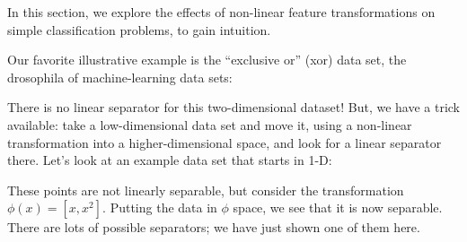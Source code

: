 In this section, we explore the effects of non-linear feature
transformations on simple classification problems, to gain intuition.

Our favorite illustrative example is the ``exclusive or'' ({\sc xor})
data set, the drosophila 
of machine-learning data sets:

\begin{examplebox}
\begin{center}
\end{center}
\end{examplebox}

There is no linear separator for this two-dimensional dataset!  But, we have a trick
available:  take a low-dimensional data set and move it, using a
non-linear transformation into a higher-dimensional space, and look
for a linear separator there. Let's look at an example data set that
starts in 1-D:

\begin{examplebox}
\begin{center}
\end{center}
\end{examplebox}

These points are not linearly separable,   but consider the
transformation $\phi(x) = [x,x^2]$. Putting the data in $\phi$ space,
we see that it is now separable.  There are lots of possible
separators;  we have just shown one of them here.

\begin{examplebox}
\begin{center}
\end{center}
\end{examplebox}

